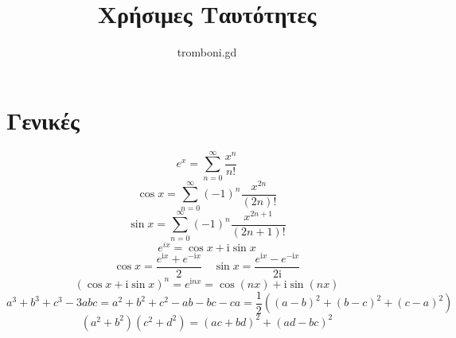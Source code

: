 \documentclass{article}
\title{Χρήσιμες Ταυτότητες}
\author{tromboni.gd}
\date{}
\begin{document}
\maketitle
\tableofcontents

\section{Γενικές}
\[
e^{x}=\sum_{n=0}^{\infty}\frac{x^{n}}{n!}
\] 
\[
    \cos x = \sum_{n=0}^{\infty}(-1)^{n}\frac{x^{2n}}{(2n)!}
\]
\[
    \sin x = \sum_{n=0}^{\infty}(-1)^{n}\frac{x^{2n+1}}{(2n+1)!}
\] 
\[
    e^{ix}=\cos x + \mathrm{i} \sin x 
\] 
\[
\cos x = \frac{e^{\mathrm{i}x}+e^{-\mathrm{i}x}}{2} \quad 
\sin x = \frac{e^{\mathrm{i}x}-e^{-\mathrm{i}x}}{2\mathrm{i}}
\] 
\[
    (\cos x + \text{i} \sin x)^{n}=e^{\text{i}nx} = \cos (nx) + \text{i} \sin (nx)
\] 
\[
a^3+b^3+c^3 - 3abc = a^2+b^2+c^2-ab-bc-ca = \frac{1}{2}\left((a-b)^2+(b-c)^2+(c-a)^2\right)
\] 
\[
    (a^2+b^2)(c^2+d^2) = (ac+bd)^2 + (ad-bc)^2
\] 
\end{document}
